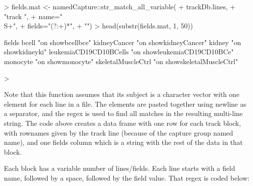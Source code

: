 \begin{Schunk}
\begin{Sinput}
> fields.mat <- namedCapture::str_match_all_variable(
+   trackDb.lines,
+   "track ",
+   name="\\S+",
+   fields="(?:\n[^\n]+)*",
+   "\n")
> head(substr(fields.mat, 1, 50))
\end{Sinput}
\begin{Soutput}
                       fields                                                 
bcell                  "\nsuperTrack on show\nshortLabel bcell\nlongLabel bce"
kidneyCancer           "\nsuperTrack on show\nshortLabel kidneyCancer\nlongLa"
kidney                 "\nsuperTrack on show\nshortLabel kidney\nlongLabel ki"
leukemiaCD19CD10BCells "\nsuperTrack on show\nshortLabel leukemiaCD19CD10BCe" 
monocyte               "\nsuperTrack on show\nshortLabel monocyte\nlongLabel "
skeletalMuscleCtrl     "\nsuperTrack on show\nshortLabel skeletalMuscleCtrl\n"
\end{Soutput}
\begin{Sinput}
> 
\end{Sinput}
\end{Schunk}

Note that this function assumes that its subject is a character vector
with one element for each line in a file. The elements are pasted
together using newline as a separator, and the regex is used to find
all matches in the resulting multi-line string. The code above creates
a data frame with one row for each track block, with rownames given by
the track line (because of the capture group named name), and one
fields column which is a string with the rest of the data in that
block.

Each block has a variable number of lines/fields. Each line starts
with a field name, followed by a space, followed by the field
value. That regex is coded below:

